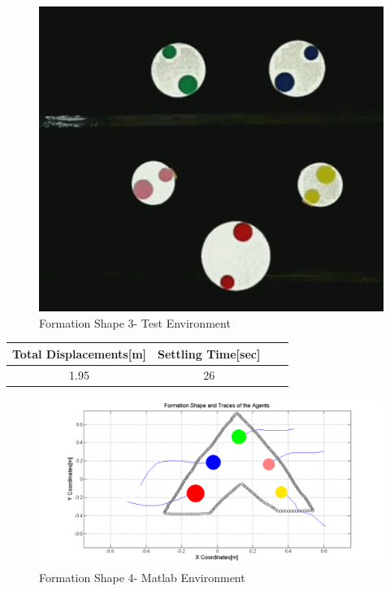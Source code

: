 \begin{figure}[H]
\caption{Formation Shape 3- Test Environment}
\centerline{\includegraphics[scale = 0.35]{5_real_hardware}}
\end{figure} 
					
\begin{center}
 \label{hardwareshape3_ref} 
\begin{tabular}{||c| c |c |c ||}
\hline
\textbf{Total Displacements[m]}  & \textbf{Settling Time[sec]}\\ 
\hline
1.95 & 26 \\
\hline
\end{tabular}
\end{center}
		
\begin{figure}[H]
\caption{Formation Shape 4- Matlab Environment}
\centerline{\includegraphics[scale = 0.45]{6_hardware}}
\end{figure} 
					
